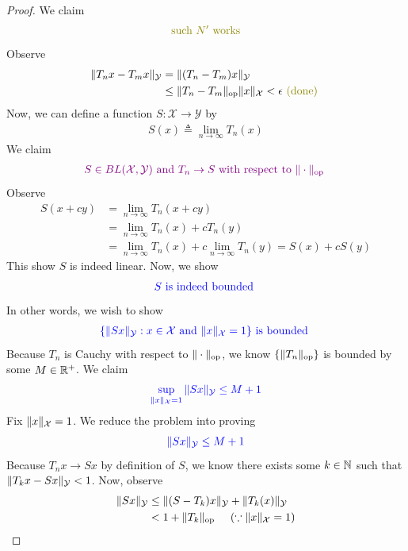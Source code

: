 \documentclass{report}
\begin{document}
\begin{proof}
We claim 
\begin{align*}
\olive{\text{ such }N'\text{ works }}
\end{align*}
Observe 
\begin{align*}
\norm{T_nx-T_mx}_\mathcal{Y}&=\norm{(T_n-T_m)x}_{\mathcal{Y}}\\
&\leq \norm{T_n-T_m}_{\text{op}} \norm{x}_{\mathcal{X}}< \epsilon \odone
\end{align*}
Now, we can define a function $S:\mathcal{X}\rightarrow \mathcal{Y}$ by 
\begin{align*}
S(x)\triangleq \lim_{n\to \infty}T_n(x)
\end{align*}
We claim 
\begin{align*}
\textcolor{violet}{S \in BL(\mathcal{X},\mathcal{Y})\text{ and }T_n \to S\text{ with respect to $\| \cdot \|_\text{op}$ }}
\end{align*}
Observe 
\begin{align*}
S(x+cy)&=\lim_{n\to \infty}T_n(x+cy)\\
&=\lim_{n\to \infty}T_n(x)+cT_n(y)\\
&=\lim_{n\to \infty}T_n(x)+c\lim_{n\to \infty}T_n(y)=S(x)+cS(y)
\end{align*}
This show $S$ is indeed linear. Now, we show 
\begin{align*}
\textcolor{blue}{S\text{ is indeed bounded }}
\end{align*}
In other words, we wish to show 
\begin{align*}
  \textcolor{blue}{\{ \| Sx \|_{\mathcal{Y}}: x \in \mathcal{X}\text{ and }\| x \|_{\mathcal{X}}=1 \}\text{ is bounded  }}
\end{align*}
Because $T_n$ is Cauchy with respect to $\| \cdot \|_{\text{op}}$, we know $\{ \| T_n \|_\text{op} \}$ is bounded by some $M\in\mathbb{R}^+$. We claim 
\begin{align*}
\textcolor{blue}{\sup_{\| x \|_{\mathcal{X}}=1} \| Sx \|_{\mathcal{Y}}\leq M+1}
\end{align*}
Fix $\| x \|_{\mathcal{X}}=1$. We reduce the problem into proving  
\begin{align*}
  \textcolor{blue}{\| Sx \|_{\mathcal{Y}}\leq M+1}
\end{align*}
Because $T_nx \to Sx$ by definition of $S$, we know there exists some  $k\in\mathbb{N}$ such that $\| T_kx-Sx \|_{\mathcal{Y}}<1$. Now, observe 
\begin{align*}
  \norm{Sx}_\mathcal{Y}&\leq \norm{(S-T_k)x}_{\mathcal{Y}}+\norm{T_k(x)}_\mathcal{Y}\\
&<1+\norm{T_k}_{\text{op}}\hspace{0.5cm}(\because \norm{x}_{\mathcal{X}}=1)\\

\end{align*}
\end{proof}
\end{document}
